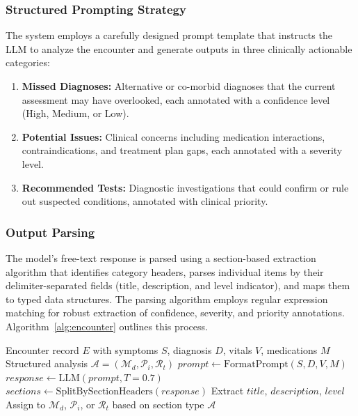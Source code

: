 \documentclass[conference]{IEEEtran}
\begin{document}
\subsubsection{Structured Prompting Strategy}
The system employs a carefully designed prompt template that instructs the LLM to analyze the encounter and generate outputs in three clinically actionable categories:

\begin{enumerate}
    \item \textbf{Missed Diagnoses:} Alternative or co-morbid diagnoses that the current assessment may have overlooked, each annotated with a confidence level (High, Medium, or Low).
    \item \textbf{Potential Issues:} Clinical concerns including medication interactions, contraindications, and treatment plan gaps, each annotated with a severity level.
    \item \textbf{Recommended Tests:} Diagnostic investigations that could confirm or rule out suspected conditions, annotated with clinical priority.
\end{enumerate}

\subsubsection{Output Parsing}
The model's free-text response is parsed using a section-based extraction algorithm that identifies category headers, parses individual items by their delimiter-separated fields (title, description, and level indicator), and maps them to typed data structures. The parsing algorithm employs regular expression matching for robust extraction of confidence, severity, and priority annotations. Algorithm~\ref{alg:encounter} outlines this process.

\begin{algorithm}[htbp]
\caption{Encounter Analysis Pipeline}
\label{alg:encounter}
\begin{algorithmic}[1]
\REQUIRE Encounter record $E$ with symptoms $S$, diagnosis $D$, vitals $V$, medications $M$
\ENSURE Structured analysis $\mathcal{A} = (\mathcal{M}_d, \mathcal{P}_i, \mathcal{R}_t)$
\STATE $prompt \leftarrow \text{FormatPrompt}(S, D, V, M)$
\STATE $response \leftarrow \text{LLM}(prompt, T=0.7)$
\STATE $sections \leftarrow \text{SplitBySectionHeaders}(response)$
        \STATE Extract $title$, $description$, $level$
        \STATE Assign to $\mathcal{M}_d$, $\mathcal{P}_i$, or $\mathcal{R}_t$ based on section type
    \ENDFOR
\ENDFOR
\RETURN $\mathcal{A}$
\end{algorithmic}
\end{algorithm}
\end{document}
